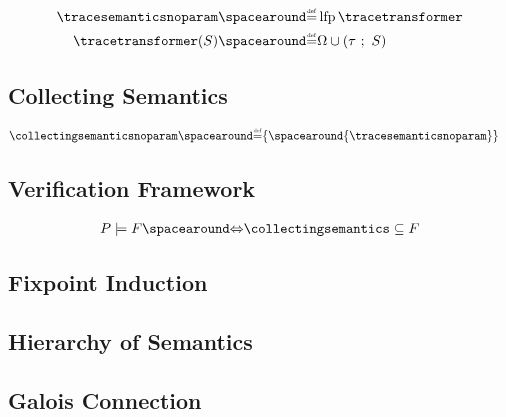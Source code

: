 \begin{definition}
  \begin{align*}
    \tracesemanticsnoparam &\DefeQ \lfp \tracetransformer \\
    \tracetransformer(\defsetoftraces) &\DefeQ \finalstates \setjoin (\mergesequences{\transitionrelation}{\defsetoftraces})
  \end{align*}
\end{definition}

\subsection{Collecting Semantics}

\begin{definition}
  \begin{align*}
    \collectingsemanticsnoparam &\DefeQ \{\spacearound{\tracesemanticsnoparam}\}
  \end{align*}

\end{definition}

\subsection{Verification Framework}

\begin{definition}[Validation]
  \begin{align*}
    \defprogram \satisfies \defproperty \IfF \collectingsemantics \subseteq \defproperty
  \end{align*}
\end{definition}

\subsection{Fixpoint Induction}

\subsection{Hierarchy of Semantics}

\subsection{Galois Connection}

